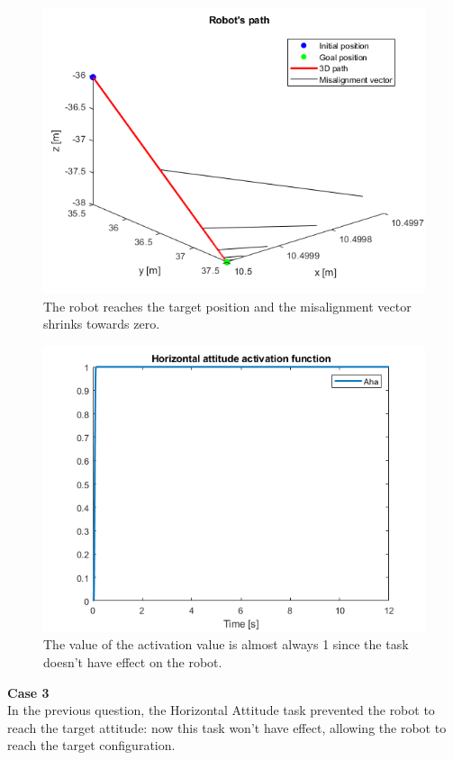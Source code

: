 \documentclass{article}
\begin{document}
\begin{figure}[H]
	\centering
	\includegraphics[width=0.7\linewidth]{images/Ex1/HorAtt_LowPrio_SameStartpos_DifferentEndpos_Path}
	\caption{The robot reaches the target position and the misalignment vector shrinks towards zero.}
	\label{fig:q3case2c}
\end{figure}
\begin{figure}[H]
	\centering
	\includegraphics[width=0.7\linewidth]{images/Ex1/HorAtt_LowPrio_SameStartpos_DifferentEndpos_ActivFunct}
	\caption{The value of the activation value is almost always 1 since the task doesn't have effect on the robot.}
	\label{fig:q3case2d}
\end{figure}


{\large \textbf{Case 3}} \\
In the previous question, the Horizontal Attitude task prevented the robot to reach the target attitude: now this task won't have effect, allowing the robot to reach the target configuration.
\end{document}
